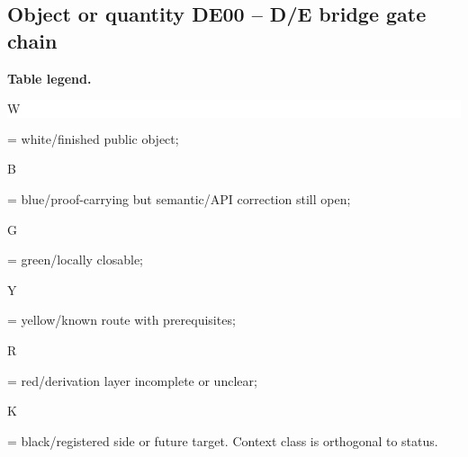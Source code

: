 \subsection*{Object or quantity DE00 -- D/\allowbreak{}E bridge gate chain}
\hypertarget{objproof:DE00}{}
\par\smallskip\noindent\begin{minipage}{0.99\linewidth}\footnotesize\raggedright\textbf{Table legend.} \colorbox{white}{\strut W} = white/finished public object; \colorbox{cyan!20}{\strut B} = blue/proof-carrying but semantic/API correction still open; \colorbox{green!18}{\strut G} = green/locally closable; \colorbox{yellow!25}{\strut Y} = yellow/known route with prerequisites; \colorbox{red!20}{\strut R} = red/derivation layer incomplete or unclear; \colorbox{black!18}{\strut K} = black/registered side or future target. Context class is orthogonal to status.\end{minipage}\par\vspace{0.25em}
